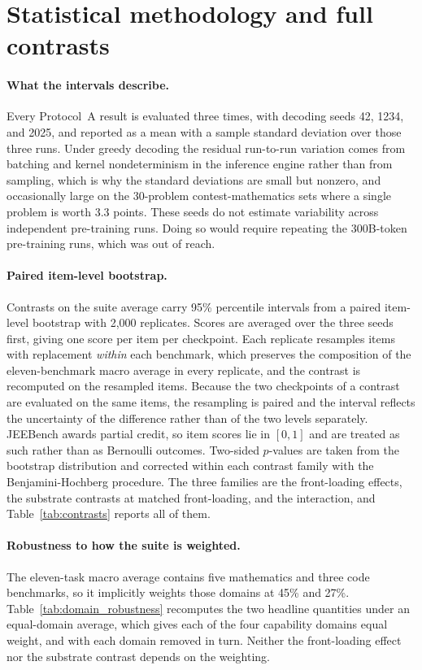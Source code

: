 \section{Statistical methodology and full contrasts}
\label{app:stats}

\paragraph{What the intervals describe.}
Every Protocol~A result is evaluated three times, with decoding seeds 42, 1234, and 2025,
and reported as a mean with a sample standard deviation over those three runs. Under
greedy decoding the residual run-to-run variation comes from batching and kernel
nondeterminism in the inference engine rather than from sampling, which is why the
standard deviations are small but nonzero, and occasionally large on the 30-problem
contest-mathematics sets where a single problem is worth 3.3 points. These seeds do not
estimate variability across independent pre-training runs. Doing so would require
repeating the 300B-token pre-training runs, which was out of reach.

\paragraph{Paired item-level bootstrap.}
Contrasts on the suite average carry 95\% percentile intervals from a paired item-level
bootstrap with 2{,}000 replicates. Scores are averaged over the three seeds first, giving
one score per item per checkpoint. Each replicate resamples items with replacement
\emph{within} each benchmark, which preserves the composition of the eleven-benchmark
macro average in every replicate, and the contrast is recomputed on the resampled items.
Because the two checkpoints of a contrast are evaluated on the same items, the resampling is
paired and the interval reflects the uncertainty of the difference rather than of the two
levels separately. JEEBench awards partial credit, so item scores lie in $[0,1]$ and are
treated as such rather than as Bernoulli outcomes. Two-sided $p$-values are taken from
the bootstrap distribution and corrected within each contrast family with the
Benjamini-Hochberg procedure. The three families are the front-loading effects, the
substrate contrasts at matched front-loading, and the interaction, and
Table~\ref{tab:contrasts} reports all of them.



\paragraph{Robustness to how the suite is weighted.}
The eleven-task macro average contains five mathematics and three code benchmarks, so it
implicitly weights those domains at 45\% and 27\%. Table~\ref{tab:domain_robustness}
recomputes the two headline quantities under an equal-domain average, which gives each of
the four capability domains equal weight, and with each domain removed in turn. Neither
the front-loading effect nor the substrate contrast depends on the weighting.

